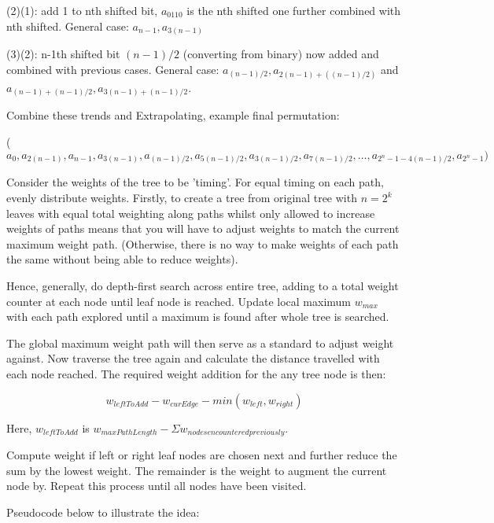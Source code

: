 \documentclass[11pt, a4paper]{article}
\begin{document}
{{{(2)(1): add 1 to nth shifted bit, $a_{0110}$ is the nth shifted one further combined with nth shifted. General case: $a_{n-1}, a_{3(n-1)}$

(3)(2): n-1th shifted bit $ (n-1)/2$ (converting from binary) now added and combined with previous cases.
General case: $a_{(n-1)/2}, a_{2(n-1)+((n-1)/2)}$ and $a_{(n-1)+(n-1)/2}, a_{3(n-1)+(n-1)/2}$.

Combine these trends and Extrapolating, example final permutation:

($a_0,a_{2(n-1)},a_{n-1},a_{3(n-1)},a_{(n-1)/2},a_{5(n-1)/2}, a_{3(n-1)/2},a_{7(n-1)/2},\dots,a_{2^n-1-4(n-1)/2},a_{2^n-1})$



Consider the weights of the tree to be 'timing'. For equal timing on each path, evenly distribute weights.
Firstly, to create a tree from original tree with $n = 2^k$ leaves with equal total weighting along paths whilst only allowed to increase weights of paths means that you will have to adjust weights to match the current maximum weight path. (Otherwise, there is no way to make weights of each path the same without being able to reduce weights).

Hence, generally, do depth-first search across entire tree, adding to a total weight counter at each node until leaf node is reached. Update local maximum $w_{max}$ with each path explored until a maximum is found after whole tree is searched.

The global maximum weight path will then serve as a standard to adjust weight against.
Now traverse the tree again and calculate the distance travelled with each node reached. The required weight addition for the any tree node is then:

\begin{equation}
  w_{leftToAdd} - w_{curEdge} - min(w_{left}, w_{right})
\end{equation}

Here, $w_{leftToAdd}$ is $w_{maxPathLength} - \Sigma w_{nodes encountered previously}$.

Compute weight if left or right leaf nodes are chosen next and further reduce the sum by the lowest weight. The remainder is the weight to augment the current node by. Repeat this process until all nodes have been visited.

Pseudocode below to illustrate the idea:

}}}
\end{document}
